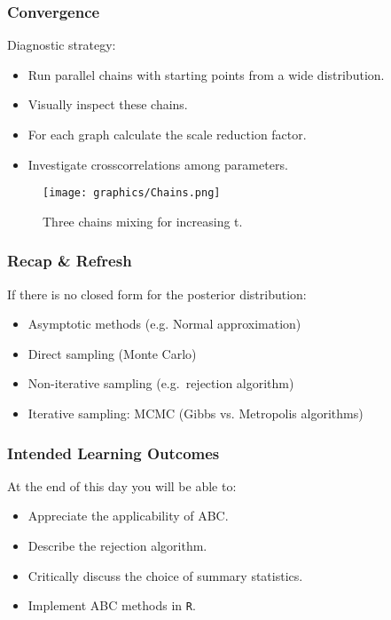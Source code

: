 \documentclass{beamer}
\newcommand{\1}{\ensuremath{\mathbf{1}}}
\begin{document}
\begin{frame}\frametitle{Convergence}
	Diagnostic strategy:
	\begin{itemize}
		\item Run parallel chains with starting points from a wide distribution.
		\item Visually inspect these chains.
		\item For each graph calculate the scale reduction factor.
		\item Investigate crosscorrelations among parameters.
	\end{itemize}
	\begin{figure}
	\begin{center}
		\texttt{[image: graphics/Chains.png]}
	\end{center}
	\caption{Three chains mixing for increasing t.}
	\end{figure}
\end{frame}
%
%
%
\begin{frame}\frametitle{Recap \& Refresh}
	If there is no closed form for the posterior distribution:
	\begin{itemize}
		\item Asymptotic methods (e.g. Normal approximation)
		\item Direct sampling (Monte Carlo)
		\item Non-iterative sampling (e.g.\ rejection algorithm)
		\item Iterative sampling: MCMC (Gibbs vs. Metropolis algorithms)
	\end{itemize}
\end{frame}
%
%
%
\begin{frame}\frametitle{Intended Learning Outcomes}
	At the end of this day you will be able to:
	\begin{itemize}
		\item Appreciate the applicability of ABC.
		\item Describe the rejection algorithm.
		\item Critically discuss the choice of summary statistics.
		\item Implement ABC methods in \texttt{R}.
	\end{itemize}
\end{frame}
\end{document}
